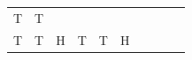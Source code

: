 {\begin{tabular}[t]{|l|l|l|l|l|l|l|l|l|l|}
    
        T &
    
    
        T%
     \tabularnewline\cline{1-1}\cline{2-2}\cline{3-3}\cline{4-4}\cline{5-5}\cline{6-6}\cline{7-7}\cline{8-8}\cline{9-9}\cline{10-10}
    
    
        T &
    
    
        T &
    
    
        H &
    
    
        T &
    
    
        T &
    
    
        H &
    
    

\end{tabular}}

